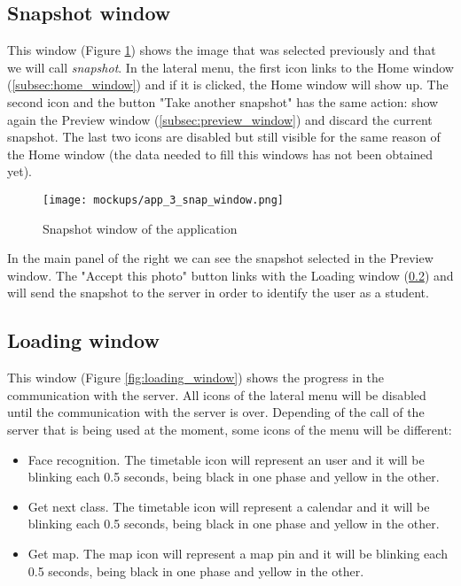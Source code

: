 	\subsection{Snapshot window}
	\label{subsec:snapshot_window}
	This window (Figure \ref{fig:snap_window}) shows the image that was selected previously and that we will call \textit{\gls{snapshot}}. In the lateral menu, the first icon links to the Home window (\ref{subsec:home_window}) and if it is clicked, the Home window will show up. The second icon and the button "Take another snapshot" has the same action: show again the Preview window (\ref{subsec:preview_window}) and discard the current snapshot. The last two icons are disabled but still visible for the same reason of the Home window (the data needed to fill this windows has not been obtained yet).

	\begin{figure}[!ht]
		\centering
		\texttt{[image: mockups/app\_3\_snap\_window.png]}
		\caption{Snapshot window of the application}
		\label{fig:snap_window}
	\end{figure}

	In the main panel of the right we can see the snapshot selected in the Preview window. The "Accept this photo" button links with the Loading window (\ref{subsec:loading_window}) and will send the snapshot to the server in order to identify the user as a student.

	\subsection{Loading window}
	\label{subsec:loading_window}
	This window (Figure \ref{fig:loading_window}) shows the progress in the communication with the server. All icons of the lateral menu will be disabled until the communication with the server is over. Depending of the call of the server that is being used at the moment, some icons of the menu will be different:

	\begin{itemize}
		\item Face recognition. The timetable icon will represent an user and it will be blinking each 0.5 seconds, being black in one phase and yellow in the other. 
		\item Get next class. The timetable icon will represent a calendar and it will be blinking each 0.5 seconds, being black in one phase and yellow in the other.
		\item Get map. The map icon will represent a map pin and it will be blinking each 0.5 seconds, being black in one phase and yellow in the other.
	\end{itemize}

